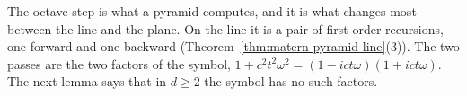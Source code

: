 The octave step is what a pyramid computes, and it is what changes most between the line and the
plane. On the line it is a pair of first-order recursions, one forward and one backward
(Theorem~\ref{thm:matern-pyramid-line}(3)). The two passes are the two factors of the symbol,
$1 + c^2t^2\omega^2 = (1 - ict\omega)(1 + ict\omega)$. The next lemma says that in $d \ge 2$ the symbol
has no such factors.

